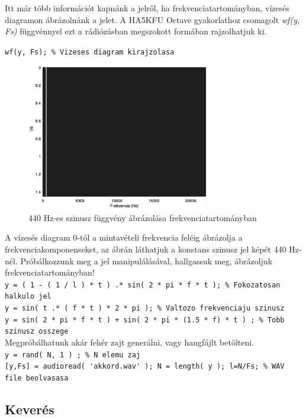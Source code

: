 \documentclass[12pt,a4paper]{article}
\begin{document}
Itt már több információt kapnánk a jelről, ha frekvenciatartományban, vízesés diagramon ábrázolnánk a jelet. A HA5KFU Octave gyakorlathoz csomagolt \textit{wf(y, Fs)} függvénnyel ezt a rádiózásban megszokott formában rajzolhatjuk ki. 


\lstinline{wf(y, Fs); % Vizeses diagram kirajzolasa }  


\begin{figure}[H]
\begin{center}
\includegraphics[width=8cm]{figures/modulaciok_workshop_waterfall.eps}
\caption{440 Hz-es szinusz függvény ábrázolása frekvenciatartományban}
\label{fig:waterfall}
\end{center}
\end{figure}

A vízesés diagram 0-tól a mintavételi frekvencia feléig ábrázolja a frekvenciakomponenseket, az ábrán láthatjuk a konstans szinusz jel képét 440 Hz-nél. Próbálkozzunk meg a jel manipulálásával, hallgassuk meg, ábrázoljuk frekvenciatartományban!\\
\lstinline{y = ( 1 - ( 1 / l ) * t ) .* sin( 2 * pi * f * t ); % Fokozatosan halkulo jel } \\
\lstinline{y = sin( t .* ( f * t ) * 2 * pi ); % Valtozo frekvenciaju szinusz } \\
\lstinline{y = sin( 2 * pi * f * t ) + sin( 2 * pi * (1.5 * f) * t ) ; % Tobb szinusz osszege }
\\
Megpróbálhatunk akár fehér zajt generálni, vagy hangfájlt betölteni. \\
\lstinline{y = rand( N, 1 ) ; % N elemu zaj}  \\
\lstinline{[y,Fs] = audioread( 'akkord.wav' ); N = length( y ); l=N/Fs; % WAV file beolvasasa}


\clearpage

\subsection{Keverés}
\end{document}

